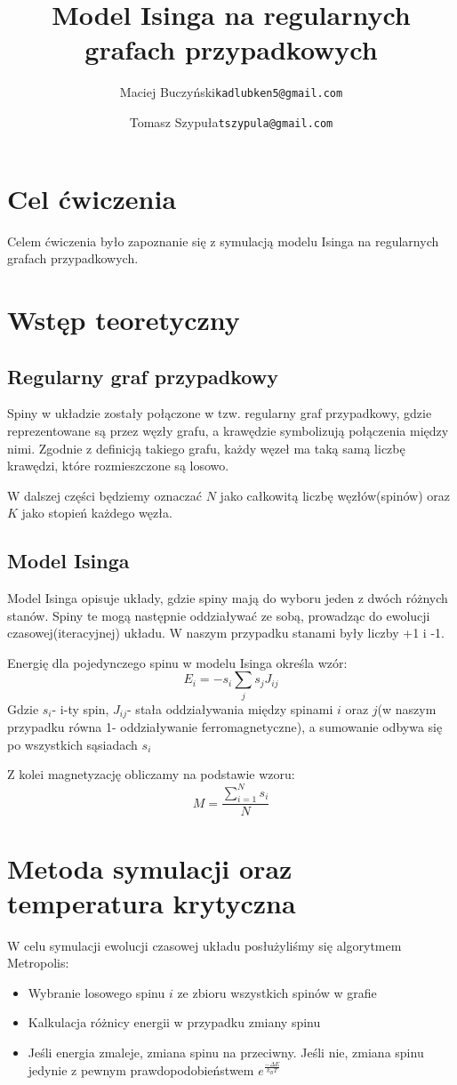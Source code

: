 \documentclass[12pt,a4paper]{article}
\author{
  Maciej Buczyński\qquad \texttt{kadlubken5@gmail.com}
  \and
  Tomasz Szypuła\qquad \texttt{tszypula@gmail.com}
}
\title{Model Isinga na regularnych grafach przypadkowych}
\begin{document}
\maketitle
\section{Cel ćwiczenia}
Celem ćwiczenia było zapoznanie się z symulacją modelu Isinga na regularnych grafach przypadkowych.

\section{Wstęp teoretyczny}
\subsection{Regularny graf przypadkowy}
Spiny w układzie zostały połączone w tzw. regularny graf przypadkowy, gdzie reprezentowane są przez węzły grafu, a krawędzie symbolizują połączenia między nimi. Zgodnie z definicją takiego grafu, każdy węzeł ma taką samą liczbę krawędzi, które rozmieszczone są losowo.

W dalszej części będziemy oznaczać $N$ jako całkowitą liczbę węzłów(spinów) oraz $K$ jako stopień każdego węzła.

\subsection{Model Isinga}
Model Isinga opisuje układy, gdzie spiny mają do wyboru jeden z dwóch różnych stanów. Spiny te mogą następnie oddziaływać ze sobą, prowadząc do ewolucji czasowej(iteracyjnej) układu. W naszym przypadku stanami były liczby +1 i -1.

Energię dla pojedynczego spinu w modelu Isinga określa wzór:
$$ E_{i}=-s_{i}\sum_{j}s_{j}J_{ij}$$
Gdzie $s_{i}$- i-ty spin, $J_{ij}$- stała oddziaływania między spinami $i$ oraz $j$(w naszym przypadku równa 1- oddziaływanie ferromagnetyczne), a sumowanie odbywa się po wszystkich sąsiadach $s_{i}$

Z kolei magnetyzację obliczamy na podstawie wzoru:
$$ M=\frac{\sum_{i=1}^{N}s_{i}}{N} $$
 
\section{Metoda symulacji oraz temperatura krytyczna}
W celu symulacji ewolucji czasowej układu posłużyliśmy się algorytmem Metropolis:
\begin{itemize}
\item Wybranie losowego spinu $i$ ze zbioru wszystkich spinów w grafie
\item Kalkulacja różnicy energii w przypadku zmiany spinu
\item Jeśli energia zmaleje, zmiana spinu na przeciwny. Jeśli nie, zmiana spinu jedynie z pewnym prawdopodobieństwem $e^{\frac{-\Delta E}{k_{B}T}}$
\end{itemize}
\end{document}
